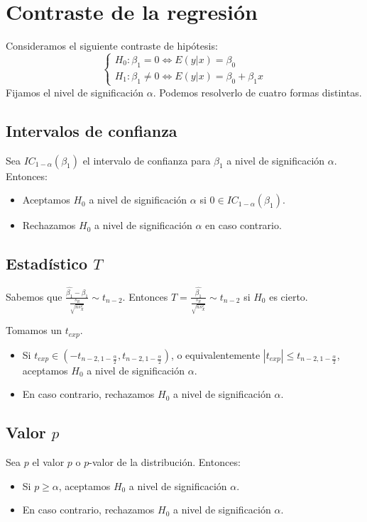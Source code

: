 \section{Contraste de la regresión}
Consideramos el siguiente contraste de hipótesis:
$$\begin{cases}
        H_0 : \beta_1 = 0 \Leftrightarrow E(y|x) = \beta_0 \\
        H_1 : \beta_1 \neq 0 \Leftrightarrow E(y|x) = \beta_0 + \beta_1x
    \end{cases}$$
Fijamos el nivel de significación $\alpha$.
Podemos resolverlo de cuatro formas distintas.

\subsection*{Intervalos de confianza}
Sea $IC_{1-\alpha}(\beta_1)$ el intervalo de confianza para $\beta_1$ a nivel de significación $\alpha$.
Entonces:
\begin{itemize}
    \item Aceptamos $H_0$ a nivel de significación $\alpha$ si $0 \in IC_{1-\alpha}(\beta_1)$.
    \item Rechazamos $H_0$ a nivel de significación $\alpha$ en caso contrario.
\end{itemize}

\subsection*{Estadístico $T$}
Sabemos que $\frac{\hat{\beta_1} - \beta_1}{\frac{s_R}{\sqrt{ns_X^2}}} \sim t_{n-2}$.
Entonces $T = \frac{\hat{\beta_1}}{\frac{s_R}{\sqrt{ns_X^2}}} \sim t_{n-2}$ si $H_0$ es cierto.

Tomamos un $t_{exp}$.
\begin{itemize}
    \item Si $t_{exp} \in (-t_{n-2, 1-\frac{\alpha}{2}}, t_{n-2, 1-\frac{\alpha}{2}})$, o equivalentemente $|t_{exp}| \leq t_{n-2, 1-\frac{\alpha}{2}}$, aceptamos $H_0$ a nivel de significación $\alpha$.
    \item En caso contrario, rechazamos $H_0$ a nivel de significación $\alpha$.
\end{itemize}

\subsection*{Valor $p$}
Sea $p$ el valor $p$ o $p$-valor de la distribución. Entonces:
\begin{itemize}
    \item Si $p \geq \alpha$, aceptamos $H_0$ a nivel de significación $\alpha$.
    \item En caso contrario, rechazamos $H_0$ a nivel de significación $\alpha$.
\end{itemize}

